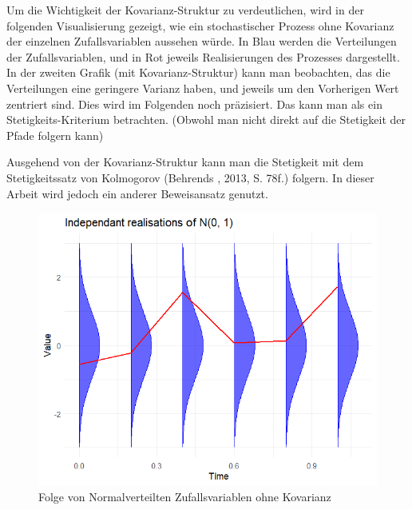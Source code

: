 \begin{bem}
Um die Wichtigkeit der Kovarianz-Struktur zu verdeutlichen, wird in der folgenden Visualisierung gezeigt, wie ein
stochastischer Prozess ohne Kovarianz der einzelnen Zufallsvariablen aussehen würde.
In Blau werden die Verteilungen der Zufallsvariablen, und in Rot jeweils Realisierungen des Prozesses dargestellt.
In der zweiten Grafik (mit Kovarianz-Struktur) kann man beobachten, das die Verteilungen eine geringere Varianz haben, und jeweils um den Vorherigen Wert zentriert sind. Dies wird im Folgenden noch präzisiert.
Das kann man als ein Stetigkeits-Kriterium betrachten. (Obwohl man nicht direkt auf die Stetigkeit der Pfade folgern kann)

Ausgehend von der Kovarianz-Struktur kann man die Stetigkeit mit dem Stetigkeitssatz von Kolmogorov (Behrends \cite{behrends}, 2013, S. 78f.) folgern.
In dieser Arbeit wird jedoch ein anderer Beweisansatz genutzt.

\begin{figure}[H]
    \centering
    \includegraphics[width=\textwidth]{images/bb_without_cov.png}
    \caption{Folge von Normalverteilten Zufallsvariablen ohne Kovarianz}
    \label{fig:bb_without_cov}


\end{figure}
\end{bem}
